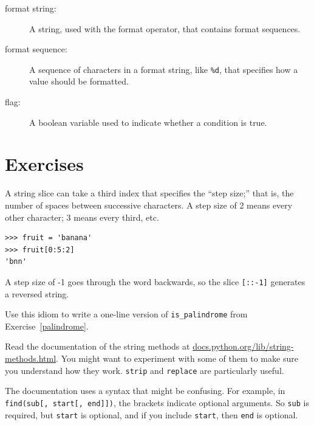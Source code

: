 \documentclass[10pt]{book}
\begin{document}
\begin{description}
\item[format string:] A string, used with the format operator, that
contains format sequences.

\item[format sequence:] A sequence of characters in a format string,
like {\tt \%d}, that specifies how a value should be formatted.

\item[flag:] A boolean variable used to indicate whether a condition
is true.


\end{description}


\section{Exercises}

\begin{ex}


A string slice can take a third index that specifies the ``step
size;'' that is, the number of spaces between successive characters.
A step size of 2 means every other character; 3 means every third,
etc.

\beforeverb
\begin{verbatim}
>>> fruit = 'banana'
>>> fruit[0:5:2]
'bnn'
\end{verbatim}
\afterverb

A step size of -1 goes through the word backwards, so
the slice \verb"[::-1]" generates a reversed string.


Use this idiom to write a one-line version of \verb"is_palindrome"
from Exercise~\ref{palindrome}.
\end{ex}


\begin{ex}

Read the documentation of the string methods at
\url{docs.python.org/lib/string-methods.html}.  You
might want to experiment with some of them to make sure
you understand how they work.  {\tt strip} and
{\tt replace} are particularly useful.

The documentation uses a syntax that might be confusing.
For example, in \verb"find(sub[, start[, end]])", the brackets
indicate optional arguments.  So {\tt sub} is required, but
{\tt start} is optional, and if you include {\tt start},
then {\tt end} is optional.
\end{ex}
\end{document}
